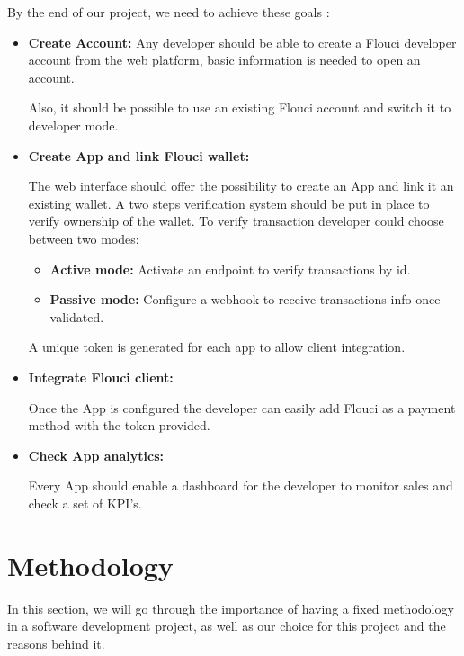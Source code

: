 \begin{spacing}{1.2}
By the end of our project, we need to achieve these goals :
\begin{itemize}
  \item \textbf{Create Account:}
  Any developer should be able to create a Flouci developer account from the web platform, basic information is needed to open an account.

  Also, it should be possible to use an existing Flouci account and switch it to developer mode.
  \item \textbf{Create App and link Flouci wallet:}

  The web interface should offer the possibility to create an App and link it an existing wallet. A two steps verification system should be put in place to verify ownership of the wallet.
  To verify transaction developer could choose between two modes:
  \begin{itemize}
  \item \textbf{Active mode:} Activate an endpoint to verify transactions by id.
  \item \textbf{Passive mode:} Configure a webhook to receive transactions info once validated.
   \end{itemize}
   A unique token is generated for each app to allow client integration.
  \item \textbf{Integrate Flouci client:}

 Once the App is configured the developer can easily add Flouci as a payment method with the token provided.
  \item \textbf{Check App analytics:}

  Every App should enable a dashboard for the developer to monitor sales and check a set of KPI's.
\end{itemize}
\section{Methodology}

In this section, we will go through the importance of having a fixed methodology in a software development project, as well as our choice for this project and the reasons behind it.

\end{spacing}
